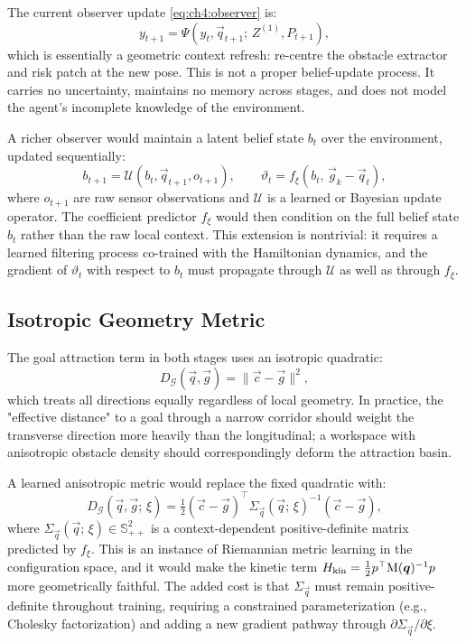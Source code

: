 The current observer update \eqref{eq:ch4:observer} is:
\begin{equation}
  y_{t+1} = \Psi(y_t, \vec{q}_{t+1};\, Z^{(1)}, P_{t+1}),
  \label{eq:ch7:observer_current}
\end{equation}
which is essentially a geometric context refresh: re-centre the
obstacle extractor and risk patch at the new pose.
This is not a proper belief-update process.
It carries no uncertainty, maintains no memory across stages, and
does not model the agent's incomplete knowledge of the environment.

A richer observer would maintain a latent belief state $b_t$ over
the environment, updated sequentially:
\begin{equation}
  b_{t+1} = \mathcal{U}(b_t, \vec{q}_{t+1}, o_{t+1}),
  \qquad
  \vartheta_t = f_\xi(b_t,\, \vec{g}_k - \vec{q}_t),
  \label{eq:ch7:belief_observer}
\end{equation}
where $o_{t+1}$ are raw sensor observations and $\mathcal{U}$ is a
learned or Bayesian update operator.
The coefficient predictor $f_\xi$ would then condition on the full
belief state $b_t$ rather than the raw local context.
This extension is nontrivial: it requires a learned filtering process
co-trained with the Hamiltonian dynamics, and the gradient of
$\vartheta_t$ with respect to $b_t$ must propagate through
$\mathcal{U}$ as well as through $f_\xi$.

\subsection{Isotropic Geometry Metric}
\label{subsec:ch7:metric}

The goal attraction term in both stages uses an isotropic quadratic:
\begin{equation}
  D_{\mathcal{G}}(\vec{q}, \vec{g})
  = \|\vec{c} - \vec{g}\|^2,
  \label{eq:ch7:iso_metric}
\end{equation}
which treats all directions equally regardless of local geometry.
In practice, the "effective distance" to a goal through a narrow
corridor should weight the transverse direction more heavily than the
longitudinal; a workspace with anisotropic obstacle density should
correspondingly deform the attraction basin.

A learned anisotropic metric would replace the fixed quadratic with:
\begin{equation}
  D_{\mathcal{G}}(\vec{q}, \vec{g};\,\xi)
  = \tfrac{1}{2}(\vec{c} - \vec{g})^\top
    \Sigma_{\vec{q}}(\vec{q};\,\xi)^{-1}
    (\vec{c} - \vec{g}),
  \label{eq:ch7:aniso_metric}
\end{equation}
where $\Sigma_{\vec{q}}(\vec{q};\,\xi) \in \mathbb{S}^2_{++}$ is a
context-dependent positive-definite matrix predicted by $f_\xi$.
This is an instance of Riemannian metric learning in the configuration
space, and it would make the kinetic term $H_{\mathrm{kin}} =
\frac{1}{2}p^\top\mathrm{M}(\boldsymbol{q})^{-1}p$ more geometrically
faithful.
The added cost is that $\Sigma_{\vec{q}}$ must remain
positive-definite throughout training, requiring a constrained
parameterization (e.g., Cholesky factorization) and adding a new
gradient pathway through $\partial\Sigma_{\vec{q}}/\partial\xi$.

